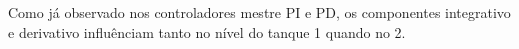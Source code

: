 Como já observado nos controladores mestre PI e PD, os componentes integrativo e derivativo influênciam tanto no
nível do tanque 1 quando no 2.